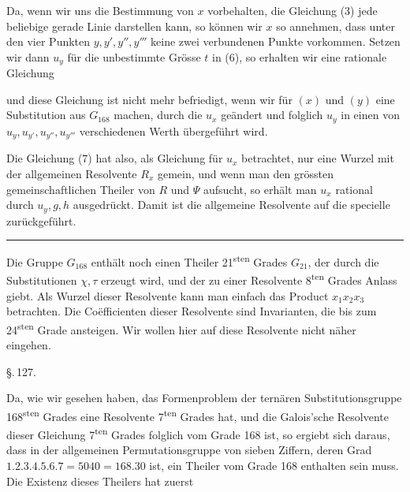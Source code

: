Da, wenn wir uns die Bestimmung von $x$ vorbehalten, die Gleichung (3) jede beliebige gerade Linie darstellen kann, so können wir $x$ so annehmen, dass unter den vier Punkten $y, y', y'', y'''$ keine zwei verbundenen Punkte vorkommen. Setzen wir dann $u_y$ für die unbestimmte Grösse $t$ in (6), so erhalten wir eine rationale Gleichung


und diese Gleichung ist nicht mehr befriedigt, wenn wir für $(x)$ und $(y)$ eine Substitution aus $G_{168}$ machen, durch die $u_x$ geändert und folglich $u_y$ in einen von $u_y, u_{y'}, u_{y''}, u_{y'''}$ verschiedenen Werth übergeführt wird.

Die Gleichung (7) hat also, als Gleichung für $u_x$ betrachtet, nur eine Wurzel mit der allgemeinen Resolvente $R_x$ gemein, und wenn man den grössten gemeinschaftlichen Theiler von $R$ und $\Psi$ aufsucht, so erhält man $u_x$ rational durch $u_y, g, h$ ausgedrückt. Damit ist die allgemeine Resolvente auf die specielle zurückgeführt.

\begin{center}\rule{0.3\linewidth}{0.4pt}\end{center}

Die Gruppe $G_{168}$ enthält noch einen Theiler 21\textsuperscript{sten} Grades $G_{21}$, der durch die Substitutionen $\chi, \tau$ erzeugt wird, und der zu einer Resolvente 8\textsuperscript{ten} Grades Anlass giebt. Als Wurzel dieser Resolvente kann man einfach das Product $x_1 x_2 x_3$ betrachten. Die Co\"efficienten dieser Resolvente sind Invarianten, die bis zum 24\textsuperscript{sten} Grade ansteigen. Wir wollen hier auf diese Resolvente nicht näher eingehen.

\begin{center}
\S.\,127.

\end{center}

Da, wie wir gesehen haben, das Formenproblem der ternären Substitutionsgruppe 168\textsuperscript{sten} Grades eine Resolvente 7\textsuperscript{ten} Grades hat, und die Galois'sche Resolvente dieser Gleichung 7\textsuperscript{ten} Grades folglich vom Grade 168 ist, so ergiebt sich daraus, dass in der allgemeinen Permutationsgruppe von sieben Ziffern, deren Grad $1.2.3.4.5.6.7 = 5040 = 168.30$ ist, ein Theiler vom Grade 168 enthalten sein muss. Die Existenz dieses Theilers hat zuerst

